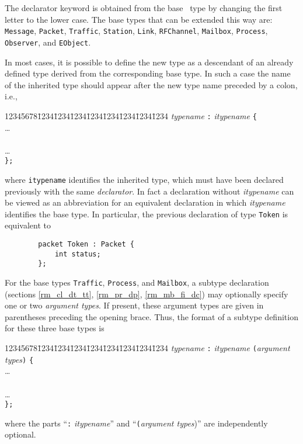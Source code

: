 The declarator keyword is obtained from the base \smurph\ type by changing
the first letter to the lower case.
The base types that can be extended this way are: {\tt Message},
{\tt Packet}, {\tt Traffic}, {\tt Station}, {\tt Link}, {\tt RFChannel},
{\tt Mailbox},
{\tt Process}, {\tt Observer}, and {\tt EObject}.

In most cases, it is possible to define the new type as a descendant of an
already defined type derived from the corresponding base type.
In such a case the name of the inherited type should appear after the new
type name preceded by a colon, i.e.,
{\tt\begin{tabbing}
12345678\=1234\=1234\=1234\=1234\=1234\=1234\=1234\=1234\kill
{} {\em typename\/} {\tt :} {\em itypename\/} {\tt \{}\\
\> \>\ldots \\
\>  \\
\> \>\ldots \\
\> {\tt \};}
\end{tabbing}}
\noindent
where {\tt itypename} identifies the inherited type, which must have been
declared previously with the same {\em declarator}.
In fact a declaration without {\em itypename\/} can be viewed as an
abbreviation for an equivalent declaration in which {\em itypename\/}
identifies the base type.
In particular, the previous declaration of type {\tt Token} is equivalent to
\begin{verbatim}
        packet Token : Packet {
            int status;
        };
\end{verbatim}

For the base types {\tt Traffic}, {\tt Process}, and {\tt Mailbox},
a subtype declaration (sections \ref{rm_cl_dt_tt}, \ref{rm_pr_dp},
\ref{rm_mb_fi_dc})
may optionally specify one or two {\em argument types}.
If present, these argument types are given in parentheses preceding the
opening brace.
Thus, the format of a subtype definition for these three base types is
{\tt\begin{tabbing}
12345678\=1234\=1234\=1234\=1234\=1234\=1234\=1234\=1234\kill
{} {\em typename\/} {\tt :} {\em itypename\/} {\tt (}{\em argument types\/}{\tt )} {\tt \{} \\
\> \>\ldots \\
\>  \\
\> \>\ldots \\
\> {\tt \};}
\end{tabbing}}
\noindent
where the parts ``{\tt :} {\em itypename\/}'' and ``{\tt (}{\em argument
types\/})'' are independently optional.

